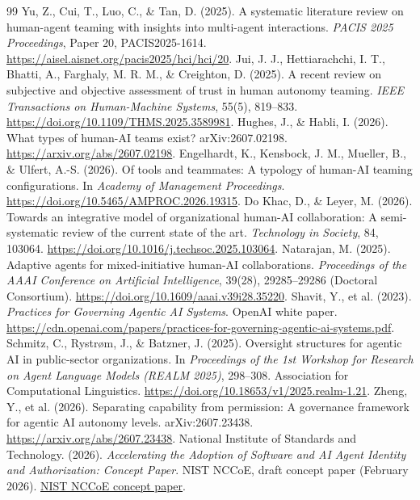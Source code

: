 \documentclass[11pt,letterpaper]{article}
\begin{document}
\begin{thebibliography}{99}
 Yu, Z., Cui, T., Luo, C., \& Tan, D. (2025). A systematic literature review on human-agent teaming with insights into multi-agent interactions. \emph{PACIS 2025 Proceedings}, Paper 20, PACIS2025-1614. \url{https://aisel.aisnet.org/pacis2025/hci/hci/20}.
 Jui, J. J., Hettiarachchi, I. T., Bhatti, A., Farghaly, M. R. M., \& Creighton, D. (2025). A recent review on subjective and objective assessment of trust in human autonomy teaming. \emph{IEEE Transactions on Human-Machine Systems}, 55(5), 819--833. \url{https://doi.org/10.1109/THMS.2025.3589981}.
 Hughes, J., \& Habli, I. (2026). What types of human-AI teams exist? arXiv:2607.02198. \url{https://arxiv.org/abs/2607.02198}.
 Engelhardt, K., Kensbock, J. M., Mueller, B., \& Ulfert, A.-S. (2026). Of tools and teammates: A typology of human-AI teaming configurations. In \emph{Academy of Management Proceedings}. \url{https://doi.org/10.5465/AMPROC.2026.19315}.
 Do Khac, D., \& Leyer, M. (2026). Towards an integrative model of organizational human-AI collaboration: A semi-systematic review of the current state of the art. \emph{Technology in Society}, 84, 103064. \url{https://doi.org/10.1016/j.techsoc.2025.103064}.
 Natarajan, M. (2025). Adaptive agents for mixed-initiative human-AI collaborations. \emph{Proceedings of the AAAI Conference on Artificial Intelligence}, 39(28), 29285--29286 (Doctoral Consortium). \url{https://doi.org/10.1609/aaai.v39i28.35220}.
 Shavit, Y., et al. (2023). \emph{Practices for Governing Agentic AI Systems}. OpenAI white paper. \url{https://cdn.openai.com/papers/practices-for-governing-agentic-ai-systems.pdf}.
 Schmitz, C., Rystr{\o}m, J., \& Batzner, J. (2025). Oversight structures for agentic AI in public-sector organizations. In \emph{Proceedings of the 1st Workshop for Research on Agent Language Models (REALM 2025)}, 298--308. Association for Computational Linguistics. \url{https://doi.org/10.18653/v1/2025.realm-1.21}.
 Zheng, Y., et al. (2026). Separating capability from permission: A governance framework for agentic AI autonomy levels. arXiv:2607.23438. \url{https://arxiv.org/abs/2607.23438}.
 National Institute of Standards and Technology. (2026). \emph{Accelerating the Adoption of Software and AI Agent Identity and Authorization: Concept Paper}. NIST NCCoE, draft concept paper (February 2026). \href{https://www.nccoe.nist.gov/sites/default/files/2026-02/accelerating-the-adoption-of-software-and-ai-agent-identity-and-authorization-concept-paper.pdf}{NIST NCCoE concept paper}.

\end{thebibliography}
\end{document}

